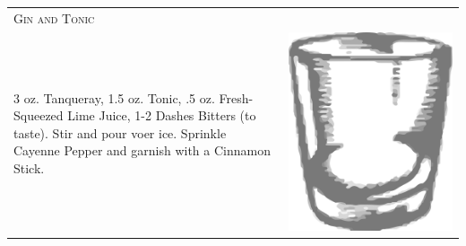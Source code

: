 \documentclass{article}
\begin{document}
\begin{tabular}{p{2in} p{0.5in}}
\multicolumn{2}{p{3in}}{\centering\Huge\textsc{Gin and Tonic}} \\ 
   \vspace{-0.1in}3 oz. Tanqueray, 1.5 oz. Tonic, .5 oz. Fresh-Squeezed Lime Juice, 1-2  Dashes Bitters (to taste). Stir and pour voer ice. Sprinkle Cayenne Pepper and garnish with a Cinnamon Stick. &
   \vspace{-0.1in} \includegraphics{rocks_glass.png}
\end{tabular}
\end{document}
